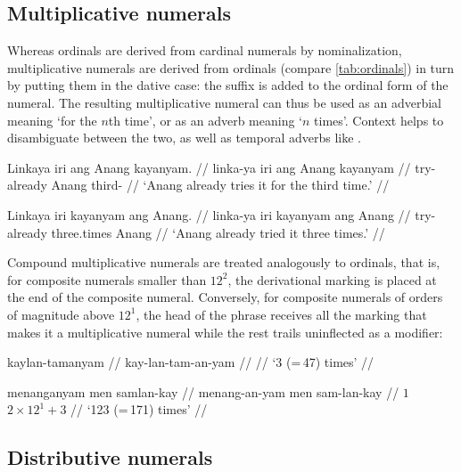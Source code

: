 
\subsection{Multiplicative numerals}

Whereas ordinals are derived from cardinal numerals by nominalization,
multiplicative numerals are derived from ordinals (compare
\autoref{tab:ordinals}) in turn by putting them in the dative case: the suffix
 is added to the ordinal form of the numeral. The resulting
multiplicative numeral can thus be used as an adverbial meaning `for the $n$th
time', or as an adverb meaning `$n$ times'. Context helps to disambiguate
between the two, as well as temporal adverbs like .

\pex
\a\begingl
	\gla Linkaya iri ang Anang kayanyam. //
	\glb linka-ya iri ang Anang kayanyam //
	\glc try-\TsgM{} already \Aarg{} Anang third-\Dat{} //
	\glft `Anang already tries it for the third time.' //
\endgl

\a\begingl
	\gla Linkaya iri kayanyam ang Anang. //
	\glb linka-ya iri kayanyam ang Anang //
	\glc try-\TsgM{} already three.times \Aarg{} Anang //
	\glft `Anang already tried it three times.' //
\endgl

\xe

Compound multiplicative numerals are treated analogously to ordinals, that is, 
for composite numerals smaller than $12^2$, the derivational marking is placed 
at the end of the composite numeral. Conversely, for composite numerals 
of orders of magnitude above $12^1$, the head of the phrase receives all 
the marking that makes it a multiplicative numeral while the rest trails 
uninflected as a modifier:

\pex
\a\begingl
	\gla kaylan-tamanyam //
	\glb kay-lan-tam-an-yam //
	 //
	\glft `3\elv{} (=\,47) times' //
\endgl

\a\begingl
	\gla menanganyam men samlan-kay //
	\glb menang-an-yam men sam-lan-kay //
	 {$1$} {$2 \times 12^1 + 3$} //
	\glft `123 (=\,171) times' //
\endgl

\xe


\subsection{Distributive numerals}

